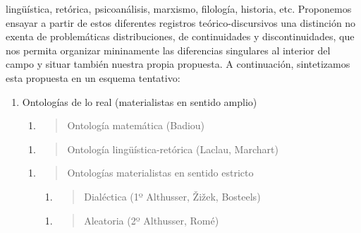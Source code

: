 lingüística, retórica, psicoanálisis, marxismo, filología, historia,
etc. Proponemos ensayar a partir de estos diferentes registros
teórico-discursivos una distinción no exenta de problemáticas
distribuciones, de continuidades y discontinuidades, que nos permita
organizar mininamente las diferencias singulares al interior del campo y
situar también nuestra propia propuesta. A continuación, sintetizamos
esta propuesta en un esquema tentativo:

\begin{enumerate}
\def\labelenumi{\arabic{enumi}.}
\item
  Ontologías de lo real (materialistas en sentido amplio)

  \begin{enumerate}
  \def\labelenumii{\arabic{enumii}.}
  \item
    \begin{quote}
    Ontología matemática (Badiou)
    \end{quote}
  \end{enumerate}

  \begin{enumerate}
  \def\labelenumii{\arabic{enumii}.}
  \item
    \begin{quote}
    Ontología lingüística-retórica (Laclau, Marchart)
    \end{quote}
  \end{enumerate}

  \begin{enumerate}
  \def\labelenumii{\arabic{enumii}.}
  \setcounter{enumii}{1}
  \item
    \begin{quote}
    Ontologías materialistas en sentido estricto
    \end{quote}

    \begin{enumerate}
    \def\labelenumiii{\arabic{enumiii}.}
    \item
      \begin{quote}
      Dialéctica (1º Althusser, Žižek, Bosteels)
      \end{quote}
    \end{enumerate}

    \begin{enumerate}
    \def\labelenumiii{\arabic{enumiii}.}
    \item
      \begin{quote}
      Aleatoria (2º Althusser, Romé)
      \end{quote}
    \end{enumerate}


\end{enumerate}
\end{enumerate}
